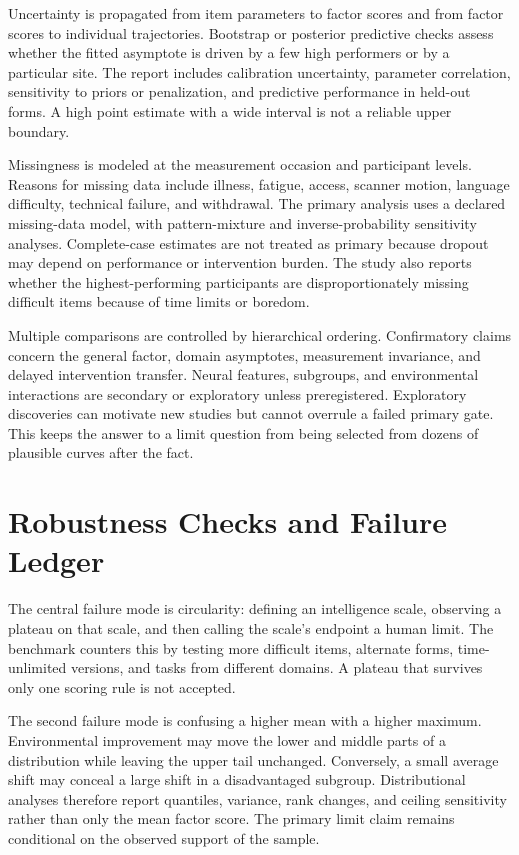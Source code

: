 \documentclass[conference]{IEEEtran}
\begin{document}
Uncertainty is propagated from item parameters to factor scores and from factor scores to individual trajectories. Bootstrap or posterior predictive checks assess whether the fitted asymptote is driven by a few high performers or by a particular site. The report includes calibration uncertainty, parameter correlation, sensitivity to priors or penalization, and predictive performance in held-out forms. A high point estimate with a wide interval is not a reliable upper boundary.

Missingness is modeled at the measurement occasion and participant levels. Reasons for missing data include illness, fatigue, access, scanner motion, language difficulty, technical failure, and withdrawal. The primary analysis uses a declared missing-data model, with pattern-mixture and inverse-probability sensitivity analyses. Complete-case estimates are not treated as primary because dropout may depend on performance or intervention burden. The study also reports whether the highest-performing participants are disproportionately missing difficult items because of time limits or boredom.

Multiple comparisons are controlled by hierarchical ordering. Confirmatory claims concern the general factor, domain asymptotes, measurement invariance, and delayed intervention transfer. Neural features, subgroups, and environmental interactions are secondary or exploratory unless preregistered. Exploratory discoveries can motivate new studies but cannot overrule a failed primary gate. This keeps the answer to a limit question from being selected from dozens of plausible curves after the fact.

\section{Robustness Checks and Failure Ledger}
\label{sec:robustness}
The central failure mode is circularity: defining an intelligence scale, observing a plateau on that scale, and then calling the scale's endpoint a human limit. The benchmark counters this by testing more difficult items, alternate forms, time-unlimited versions, and tasks from different domains. A plateau that survives only one scoring rule is not accepted.

The second failure mode is confusing a higher mean with a higher maximum. Environmental improvement may move the lower and middle parts of a distribution while leaving the upper tail unchanged. Conversely, a small average shift may conceal a large shift in a disadvantaged subgroup. Distributional analyses therefore report quantiles, variance, rank changes, and ceiling sensitivity rather than only the mean factor score. The primary limit claim remains conditional on the observed support of the sample.
\end{document}
